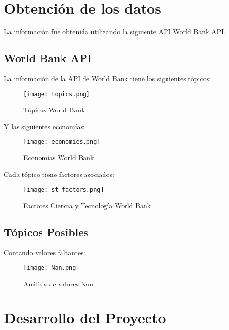 \documentclass{other/docTemplate}
\begin{document}
\clearpage
\section{Obtención de los datos}
La información fue obtenida utilizando la siguiente API \href{https://datahelpdesk.worldbank.org/knowledgebase/topics/125589}{World Bank API}.


\subsection{World Bank API}

La información de la API de World Bank tiene los siguientes tópicos:

\begin{figure}[htbp!]
  \centering
  \texttt{[image: topics.png]}
  \caption{Tópicos World Bank}
  \label{fig:topics}
\end{figure}

Y las siguientes economías:

\begin{figure}[htbp!]
  \centering
  \texttt{[image: economies.png]}
  \caption{Economías World Bank}
  \label{fig:economies}
\end{figure}

Cada tópico tiene factores asociados:

\begin{figure}[htbp!]
  \centering
  \texttt{[image: st\_factors.png]}
  \caption{Factores Ciencia y Tecnología World Bank}
  \label{fig:stfactors}
\end{figure}


\subsection{Tópicos Posibles}

Contando valores faltantes:

\begin{figure}[htbp!]
  \centering
  \texttt{[image: Nan.png]}
  \caption{Análisis de valores Nan}
  \label{fig:nan}
\end{figure}

\clearpage
\section{Desarrollo del Proyecto} 
\end{document}
